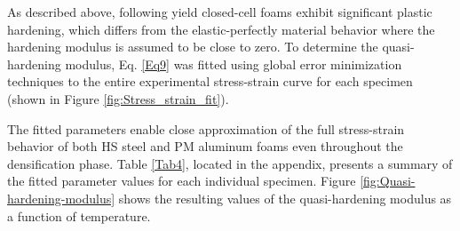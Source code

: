 \documentclass[review]{elsarticle}
\begin{document}
{As described above, following yield closed-cell foams exhibit significant plastic hardening, which differs from the elastic-perfectly material behavior where the hardening modulus is assumed to be close to zero. To determine the quasi-hardening modulus, Eq. \ref{Eq9} was fitted using global error minimization techniques to the entire experimental stress-strain curve for each specimen (shown in Figure \ref{fig:Stress_strain_fit}).


The fitted parameters enable close approximation of the full stress-strain behavior of both HS steel and PM aluminum foams even throughout the densification phase. Table \ref{Tab4}, located in the appendix, presents a summary of the fitted parameter values for each individual specimen. Figure \ref{fig:Quasi-hardening-modulus} shows the resulting values of the quasi-hardening modulus as a function of temperature.

}
\end{document}
